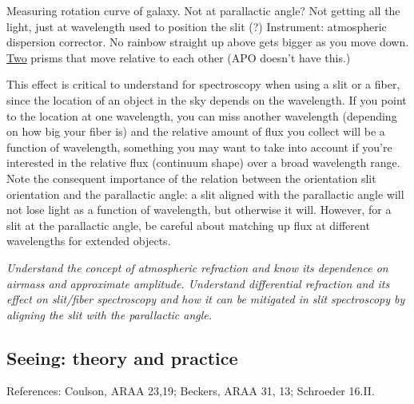 \documentclass[12pt]{article}
\newcommand{\mynotes}[1]{\textcolor{myBlue}{#1}}
\newcommand{\test}[1]{%
    \begin{center}
        {\parbox{0.9\textwidth}{\textit{\small#1}}}
    \end{center}}
\begin{document}
\mynotes{Measuring rotation curve of galaxy. Not at parallactic angle? Not
getting all the light, just at wavelength used to position the slit (?)
Instrument: atmospheric dispersion corrector. No rainbow straight up above gets
bigger as you move down. \underline{Two} prisms that move relative to each
other (APO doesn't have this.)}

This effect is critical to understand for spectroscopy when using a slit or a
fiber, since the location of an object in the sky depends on the wavelength. If
you point to the location at one wavelength, you can miss another wavelength
\mynotes{(depending on how big your fiber is)} and the relative amount of flux
you collect will be a function of wavelength, something you may want to take
into account if you're interested in the relative flux (continuum shape) over a
broad wavelength range. Note the consequent importance of the relation between
the orientation slit orientation and the parallactic angle: a slit aligned with
the parallactic angle will not lose light as a function of wavelength, but
otherwise it will. However, for a slit at the parallactic angle, be careful
about matching up flux at different wavelengths for extended objects.

\test{Understand the concept of atmospheric refraction and know its dependence
on airmass and approximate amplitude. Understand differential refraction and
its effect on slit/fiber spectroscopy and how it can be mitigated in slit
spectroscopy by aligning the slit with the parallactic angle.}

\subsection{Seeing: theory and practice}
References: Coulson, ARAA 23,19; Beckers, ARAA 31, 13; Schroeder 16.II.
\end{document}
